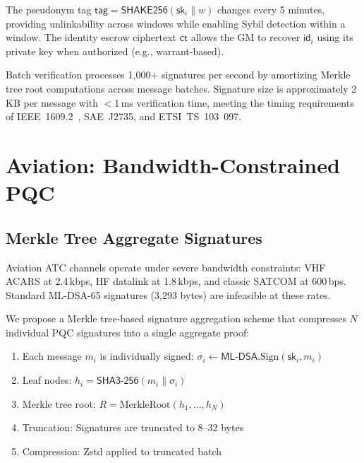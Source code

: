 \documentclass[conference,10pt]{IEEEtran}
\newcommand{\mldsa}{\textsf{ML-DSA}}
\newcommand{\shake}{\textsf{SHAKE256}}
\newcommand{\shaiii}{\textsf{SHA3-256}}
\begin{document}
The pseudonym tag $\mathsf{tag} = \shake{}(\mathsf{sk}_i \| w)$ changes every 5 minutes, providing unlinkability across windows while enabling Sybil detection within a window. The identity escrow ciphertext $\mathsf{ct}$ allows the GM to recover $\mathsf{id}_i$ using its private key when authorized (e.g., warrant-based).

Batch verification processes 1{,}000+ signatures per second by amortizing Merkle tree root computations across message batches. Signature size is approximately 2\,KB per message with $<$1\,ms verification time, meeting the timing requirements of IEEE~1609.2~\cite{ieee16092}, SAE~J2735, and ETSI~TS~103~097.

\section{Aviation: Bandwidth-Constrained PQC}
\label{sec:aviation}

\subsection{Merkle Tree Aggregate Signatures}

Aviation ATC channels operate under severe bandwidth constraints: VHF ACARS at 2.4\,kbps, HF datalink at 1.8\,kbps, and classic SATCOM at 600\,bps. Standard \mldsa{}-65 signatures (3{,}293 bytes) are infeasible at these rates.

We propose a Merkle tree-based signature aggregation scheme that compresses $N$ individual PQC signatures into a single aggregate proof:

\begin{enumerate}
    \item Each message $m_i$ is individually signed: $\sigma_i \leftarrow \mldsa{}.\text{Sign}(\mathsf{sk}_i, m_i)$
    \item Leaf nodes: $h_i = \shaiii{}(m_i \| \sigma_i)$
    \item Merkle tree root: $R = \text{MerkleRoot}(h_1, \ldots, h_N)$
    \item Truncation: Signatures are truncated to 8--32 bytes
    \item Compression: Zstd applied to truncated batch
\end{enumerate}
\end{document}
